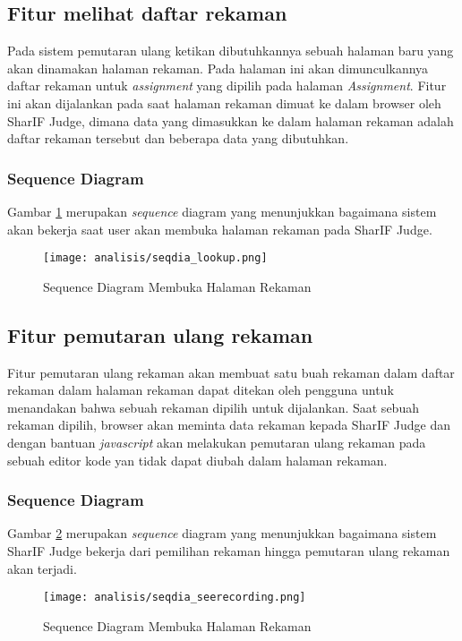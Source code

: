 \subsection{Fitur melihat daftar rekaman}
\label{sub:3:2:lookup}
Pada sistem pemutaran ulang ketikan dibutuhkannya sebuah halaman baru yang akan dinamakan halaman rekaman. Pada halaman ini akan dimunculkannya daftar rekaman untuk \textit{assignment} yang dipilih pada halaman \textit{Assignment}. Fitur ini akan dijalankan pada saat halaman rekaman dimuat ke dalam browser oleh SharIF Judge, dimana data yang dimasukkan ke dalam halaman rekaman adalah daftar rekaman tersebut dan beberapa data yang dibutuhkan.

\subsubsection{Sequence Diagram}
Gambar \ref{fig:3:2:seqdia_lookup} merupakan \textit{sequence} diagram yang menunjukkan bagaimana sistem akan bekerja saat user akan membuka halaman rekaman pada SharIF Judge.
\begin{figure}[H]
	\centering
	\texttt{[image: analisis/seqdia\_lookup.png]}
	\caption{Sequence Diagram Membuka Halaman Rekaman}
	\label{fig:3:2:seqdia_lookup}
\end{figure}

\subsection{Fitur pemutaran ulang rekaman}
\label{sub:3:2:seerecording}

Fitur pemutaran ulang rekaman akan membuat satu buah rekaman dalam daftar rekaman dalam halaman rekaman dapat ditekan oleh pengguna untuk menandakan bahwa sebuah rekaman dipilih untuk dijalankan. Saat sebuah rekaman dipilih, browser akan meminta data rekaman kepada SharIF Judge dan dengan bantuan \textit{javascript} akan melakukan pemutaran ulang rekaman pada sebuah editor kode yan tidak dapat diubah dalam halaman rekaman.

\subsubsection{Sequence Diagram}
Gambar \ref{fig:3:2:seqdia_seerecording} merupakan \textit{sequence} diagram yang menunjukkan bagaimana sistem SharIF Judge bekerja dari pemilihan rekaman hingga pemutaran ulang rekaman akan terjadi.
\begin{figure}[H]
	\centering
	\texttt{[image: analisis/seqdia\_seerecording.png]}
	\caption{Sequence Diagram Membuka Halaman Rekaman}
	\label{fig:3:2:seqdia_seerecording}
\end{figure}


